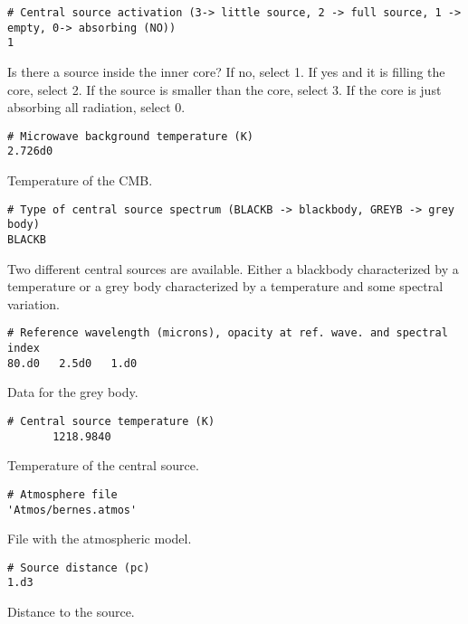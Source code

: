 \documentclass[12pt]{article}
\begin{document}
\begin{footnotesize} \begin{verbatim}
# Central source activation (3-> little source, 2 -> full source, 1 -> empty, 0-> absorbing (NO))
1
\end{verbatim} \end{footnotesize}
Is there a source inside the inner core? If no, select 1. If yes and it is filling
the core, select 2. If the source is smaller than the core, select 3. If the core
is just absorbing all radiation, select 0.

\begin{footnotesize} \begin{verbatim}
# Microwave background temperature (K)
2.726d0
\end{verbatim} \end{footnotesize}
Temperature of the CMB.

\begin{footnotesize} \begin{verbatim}
# Type of central source spectrum (BLACKB -> blackbody, GREYB -> grey body)
BLACKB
\end{verbatim} \end{footnotesize}
Two different central sources are available. Either a blackbody characterized
by a temperature or a grey body characterized by a temperature and some
spectral variation.

\begin{footnotesize} \begin{verbatim}
# Reference wavelength (microns), opacity at ref. wave. and spectral index
80.d0	2.5d0	1.d0
\end{verbatim} \end{footnotesize}
Data for the grey body.

\begin{footnotesize} \begin{verbatim}
# Central source temperature (K)
       1218.9840
\end{verbatim} \end{footnotesize}
Temperature of the central source.

\begin{footnotesize} \begin{verbatim}
# Atmosphere file
'Atmos/bernes.atmos'
\end{verbatim} \end{footnotesize}
File with the atmospheric model.

\begin{footnotesize} \begin{verbatim}
# Source distance (pc)
1.d3
\end{verbatim} \end{footnotesize}
Distance to the source.
\end{document}
